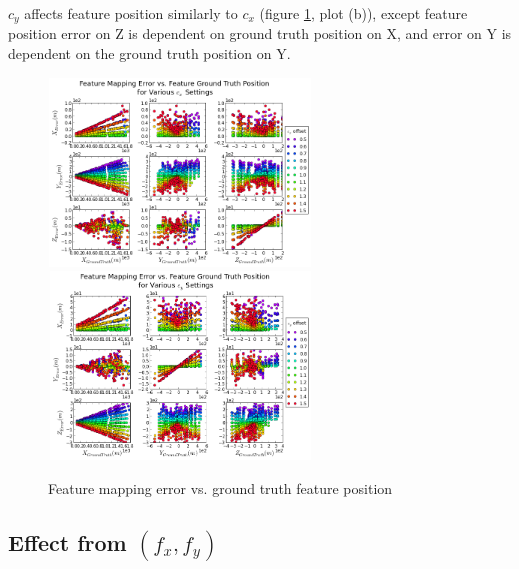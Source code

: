 $c_{y}$ affects feature position similarly to $c_{x}$ (figure
\ref{fig:simfig32-33}, plot (b)), except feature position error on Z
is dependent on ground truth position on X, and error on Y is
dependent on the ground truth position on Y.

\begin{figure}[h]
  \centering
  \includegraphics[width=7cm, height=5cm]{./Figures/SimulationFigures/Figure32.png}
  \includegraphics[width=7cm, height=5cm]{./Figures/SimulationFigures/Figure33.png}
  \caption{Feature mapping error vs. ground truth feature position}
  \label{fig:simfig32-33}
\end{figure}

\FloatBarrier
\subsection{Effect from $(f_x, f_y)$}

